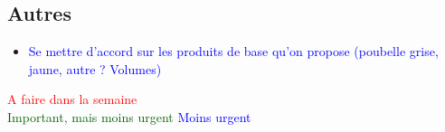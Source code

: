 \documentclass[10pt,a4paper]{report}
\begin{document}
\subsection*{Autres}
\begin{itemize}
        \item \textcolor{blue}{Se mettre d’accord sur les produits de base qu’on propose (poubelle grise, jaune, autre ? Volumes)}
\end{itemize}

\textcolor{red}{A faire dans la semaine} \\
\textcolor{darkgreen}{Important, mais moins urgent}
\textcolor{blue}{Moins urgent}
\end{document}
